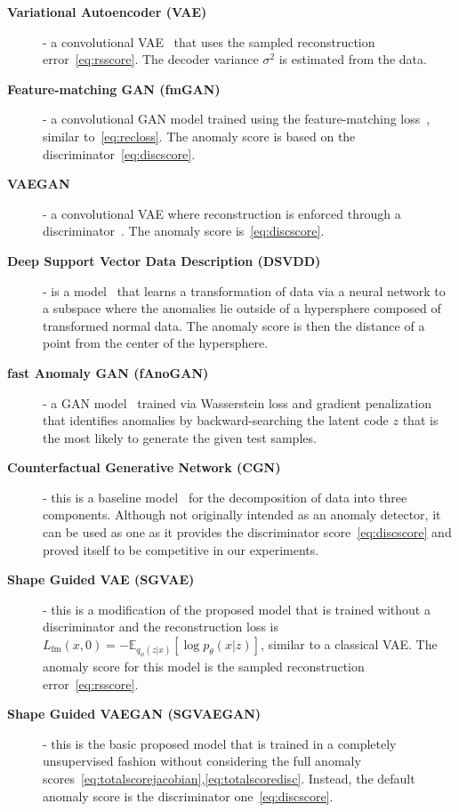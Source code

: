 \begin{description}
    \item[\textbf{Variational Autoencoder (VAE)}] - a convolutional VAE~\cite{an2015variational, kingma2013vae} that uses the sampled reconstruction error~\eqref{eq:rsscore}. The decoder variance $\sigma^2$ is estimated from the data.
    \item[\textbf{Feature-matching GAN (fmGAN)}] - a convolutional GAN model trained using the feature-matching loss~\cite{salimans2016fmgan}, similar to~\eqref{eq:recloss}. The anomaly score is based on the discriminator~\eqref{eq:discscore}.
    \item[\textbf{VAEGAN}] - a  convolutional VAE where reconstruction is enforced through a discriminator~\cite{larsen2016autoencoding}. The anomaly score is~\eqref{eq:discscore}.
    \item[\textbf{Deep Support Vector Data Description (DSVDD)}] - is a model~\cite{ruff2018deep} that learns a transformation of data via a neural network to a subspace where the anomalies lie outside of a hypersphere composed of transformed normal data. The anomaly score is then the distance of a point from the center of the hypersphere.
    \item[\textbf{fast Anomaly GAN (fAnoGAN)}] - a GAN model~\cite{schleglFAnoGANFastUnsupervised2019} trained via Wasserstein loss and gradient penalization that identifies anomalies by backward-searching the latent code $z$ that is the most likely to generate the given test samples.
    \item[\textbf{Counterfactual Generative Network (CGN)}] - this is a baseline model~\cite{sauer2021counterfactual} for the decomposition of data into three components. Although not originally intended as an anomaly detector, it can be used as one as it provides the discriminator score~\eqref{eq:discscore} and proved itself to be competitive in our experiments.
    \item[\textbf{Shape Guided VAE (SGVAE)}] - this is a modification of the proposed model that is trained without a discriminator and the reconstruction loss is $L_{\text{fm}}(x,0) = -\mathbb{E}_{q_{\phi}(z \vert x)}[\log p_{\theta}(x \vert z)]$, similar to a classical VAE. The anomaly score for this model is the sampled reconstruction error~\eqref{eq:rsscore}.
    \item[\textbf{Shape Guided VAEGAN (SGVAEGAN)}] - this is the basic proposed model that is trained in a completely unsupervised fashion without considering the full anomaly scores~\eqref{eq:totalscorejacobian},\eqref{eq:totalscoredisc}. Instead, the default anomaly score is the discriminator one~\eqref{eq:discscore}.

\end{description}
